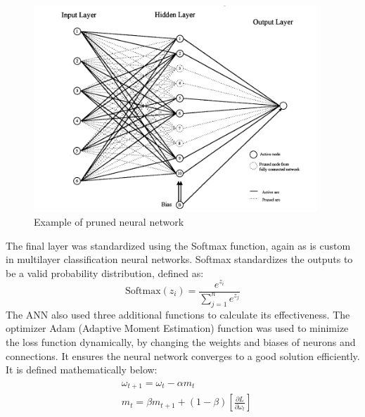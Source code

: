 \documentclass{mcmthesis}
\begin{document}
\begin{figure} [H]
    \centering
    \includegraphics[width=0.95\textwidth]{prunes-nn-vis}
    \caption{Example of pruned neural network}
    \label{exampleID}
    \label{figure: NN}
\end{figure}

The final layer was standardized using the Softmax function, again as is custom in multilayer classification neural networks. Softmax standardizes the outputs to be a valid probability distribution, defined as:
\begin{equation}\label{eq:softmax}
    \text{Softmax}(z_i) = \frac{e^{z_i}}{\sum_{j=1}^{n} e^{z_j}}
\end{equation}
The ANN also used three additional functions to calculate its effectiveness. The optimizer Adam (Adaptive Moment Estimation) function was used to minimize the loss function dynamically, by changing the weights and biases of neurons and connections. It ensures the neural network converges to a good solution efficiently. It is defined mathematically below:
\begin{align}\label{eq:adam func}
    \begin{split}
    &\omega_{t+1}=\omega_t-\alpha m_t\\
    &m_t = \beta m_{t+1} + (1-\beta) \left[\frac{\partial L}{\partial \omega_t} \right]
    \end{split}
\end{align}
\end{document}
